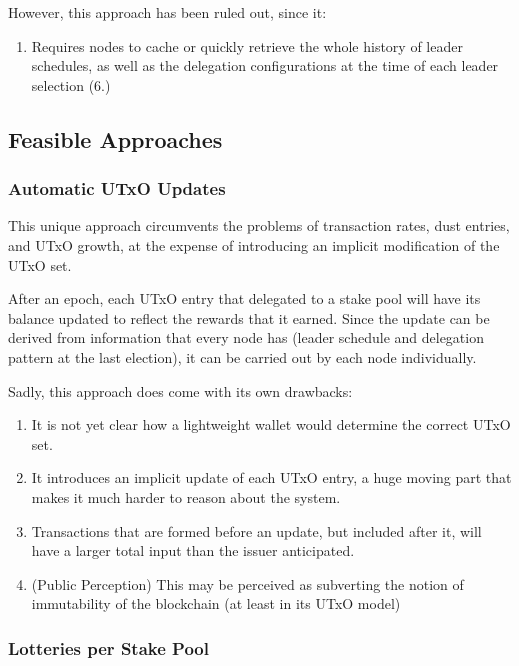 \documentclass[11pt,a4paper]{article}
\begin{document}
However, this approach has been ruled out, since it:

\begin{enumerate}
\item
  Requires nodes to cache or quickly retrieve the whole history of
  leader schedules, as well as the delegation configurations at the time
  of each leader selection (6.)
\end{enumerate}

\subsection{Feasible Approaches}
\label{feasible-approaches}

\subsubsection{Automatic UTxO Updates}
\label{automatic-utxo-updates}

This unique approach circumvents the problems of transaction rates, dust
entries, and UTxO growth, at the expense of introducing an implicit
modification of the UTxO set.

After an epoch, each UTxO entry that delegated to a stake pool will have
its balance updated to reflect the rewards that it earned. Since the
update can be derived from information that every node has (leader
schedule and delegation pattern at the last election), it can be carried
out by each node individually.

Sadly, this approach does come with its own drawbacks:

\begin{enumerate}
\item
  It is not yet clear how a lightweight wallet would determine the
  correct UTxO set.
\item
  It introduces an implicit update of each UTxO entry, a huge moving
  part that makes it much harder to reason about the system.
\item
  Transactions that are formed before an update, but included after it,
  will have a larger total input than the issuer anticipated.
\item
  (Public Perception) This may be perceived as subverting the notion of
  immutability of the blockchain (at least in its UTxO model)
\end{enumerate}

\subsubsection{Lotteries per Stake Pool}
\label{lotteries-per-stake-pool}
\end{document}

